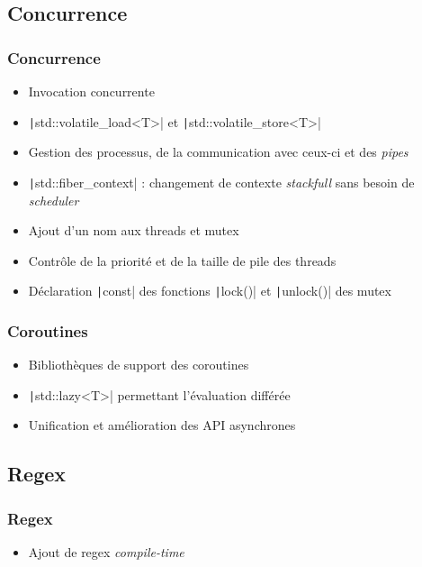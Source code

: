 \documentclass[C++.tex]{subfiles}
\begin{document}
\subsection*{Concurrence}
\begin{frame}[fragile]
	\frametitle{Concurrence}
	\begin{itemize}
		\item Invocation concurrente
		\item \texttt|std::volatile_load<T>| et \texttt|std::volatile_store<T>|
		\item Gestion des processus, de la communication avec ceux-ci et des \textit{pipes}
		\item \texttt|std::fiber_context| : changement de contexte \textit{stackfull} sans besoin de \textit{scheduler}
		\item Ajout d'un nom aux threads et mutex
		\item Contrôle de la priorité et de la taille de pile des threads
		\item Déclaration \texttt|const| des fonctions \texttt|lock()| et \texttt|unlock()| des mutex

	\end{itemize}

\end{frame}

\begin{frame}[fragile]
	\frametitle{Coroutines}
	\begin{itemize}
		\item Bibliothèques de support des coroutines
		\item \texttt|std::lazy<T>| permettant l'évaluation différée
		\item Unification et amélioration des API asynchrones
	\end{itemize}
\end{frame}

\subsection*{Regex}
\begin{frame}[fragile]
	\frametitle{Regex}
	\begin{itemize}
		\item Ajout de regex \textit{compile-time}
	\end{itemize}
\end{frame}
\end{document}
